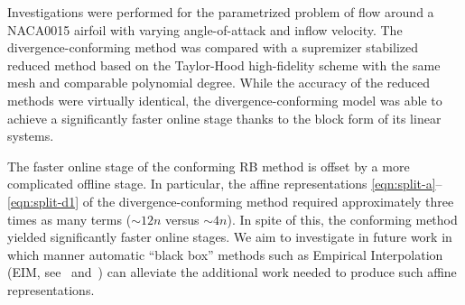 \documentclass[onecolumn, twoside, a4paper, 11pt]{article}
\begin{document}
Investigations were performed for the parametrized problem of flow around a NACA0015 airfoil with
varying angle-of-attack and inflow velocity. The divergence-conforming method was compared with a
supremizer stabilized reduced method based on the Taylor-Hood high-fidelity scheme with the same
mesh and comparable polynomial degree. While the accuracy of the reduced methods were virtually
identical, the divergence-conforming model was able to achieve a significantly faster online stage
thanks to the block form of its linear systems.

The faster online stage of the conforming RB method is offset by a more complicated offline stage.
In particular, the affine
representations \eqref{eqn:split-a}--\eqref{eqn:split-d1} of the divergence-conforming method
required approximately three times as many terms ($\sim 12n$ versus $\sim 4n$). In spite of this,
the conforming method yielded significantly faster online stages. We aim to investigate in future work
in which manner automatic ``black box'' methods such as Empirical Interpolation
(EIM, see~\cite{Barrault2004eim,Grepl2007erb,Maday2007gmi} and~\cite[Chapter 10]{Quarteroni2016rbm})
can alleviate the additional work needed to produce such affine representations.



\end{document}
